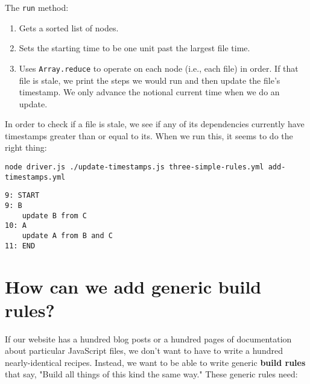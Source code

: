 \documentclass[krantzl]{krantz}
\newcommand{\glossref}[1]{\textbf{#1}}
\begin{document}
The \texttt{run} method:

\begin{enumerate}

\item 

Gets a sorted list of nodes.



\item 

Sets the starting time to be one unit past the largest file time.



\item 

Uses \texttt{Array.reduce} to operate on each node (i.e., each file) in order.
    If that file is stale,
    we print the steps we would run and then update the file's timestamp.
    We only advance the notional current time when we do an update.



\end{enumerate}


In order to check if a file is stale,
we see if any of its dependencies currently have timestamps greater than or equal to its.
When we run this,
it seems to do the right thing:


\begin{lstlisting}[frame=single,frameround=tttt]
node driver.js ./update-timestamps.js three-simple-rules.yml add-timestamps.yml
\end{lstlisting}



\begin{lstlisting}[frame=single,frameround=tttt]
9: START
9: B
    update B from C
10: A
    update A from B and C
11: END
\end{lstlisting}



\section{How can we add generic build rules?}\label{build-manager-generic}


If our website has a hundred blog posts
or a hundred pages of documentation about particular JavaScript files,
we don't want to have to write a hundred nearly-identical recipes.
Instead,
we want to be able to write generic \glossref{build rules} that say,
"Build all things of this kind the same way."
These generic rules need:
\end{document}
